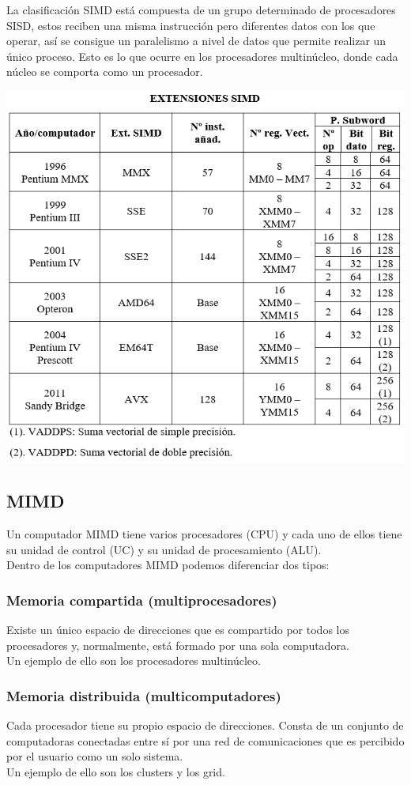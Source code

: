 \documentclass[11pt,letterpaper]{article}
\begin{document}
La clasificación SIMD está compuesta de un grupo determinado de procesadores SISD, estos reciben una misma instrucción pero diferentes datos con los que operar, así se consigue un paralelismo a nivel de datos que permite realizar un único proceso. Esto es lo que ocurre en los procesadores multinúcleo, donde cada núcleo se comporta como un procesador.
\begin{center}
	\includegraphics[scale=0.9]{ExtensionesSIMD.png}
\end{center}
\subsection{MIMD}
\noindent
Un computador MIMD tiene varios procesadores (CPU) y cada uno de ellos tiene su unidad de control (UC) y su unidad de procesamiento (ALU).\\
Dentro de los computadores MIMD podemos diferenciar dos tipos:
\newpage
\subsubsection{Memoria compartida (multiprocesadores)}
\noindent
Existe un único espacio de direcciones que es compartido por todos los procesadores y, normalmente, está formado por una sola computadora.\\
Un ejemplo de ello son los procesadores multinúcleo.
\subsubsection{Memoria distribuida (multicomputadores)}
\noindent
Cada procesador tiene su propio espacio de direcciones. Consta de un conjunto de computadoras conectadas entre sí por una red de comunicaciones que es percibido por el usuario como un solo sistema.\\
Un ejemplo de ello son los clusters y los grid.
\end{document}
